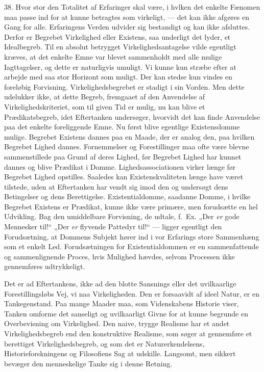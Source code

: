 \documentclass[12pt,a4paper]{book}
\newcommand{\apage}[1]{\marginnote{\footnotesize\textit{[#1]}}}
\begin{document}
38. Hvor stor den Totalitet af Erfaringer skal være, i hvlken det enkelte Fænomen maa passe ind for at kunne betragtes som virkeligt, ---
det kan ikke afgøres en Gang for alle. Erfaringens Verden udvider sig
bestandigt og kan ikke afsluttes. Derfor er Begrebet Virkelighed eller
Existens, saa underligt det lyder, et Idealbegreb. Til en absolut
betrygget Virkelighedsantagelse vilde egentligt kræves, at det enkelte
Emne var blevet sammenholdt med alle mulige Iagttagelser, og dette er
naturligvis umuligt. Vi kunne kun stræbe efter at arbejde med saa stor
Horizont som muligt. Der kan stedse kun vindes en foreløbig Forvisning.
Virkelighedsbegrebet er stadigt i sin Vorden. Men dette udelukker ikke,
at dette Begreb, fremgaaet af den Anvendelse af Virkelighedskriteriet,
som til given Tid er mulig, nu kan blive et Prædikatsbegreb, \apage{106} idet
Eftertanken undersøger, hvorvidt det kan finde Anvendelse paa det enkelte
foreliggende Emne. Nu først blive egentlige Existensdomme mulige.
Begrebet Existens dannes paa en Maade, der er analog den, paa hvilken
Begrebet Lighed dannes. Fornemmelser og Forestillinger maa ofte være
blevne sammenstillede paa Grund af deres Lighed, før Begrebet Lighed har
kunnet dannes og blive Prædikat i Domme. Lighedsassociationen virker
længe før Begrebet Lighed opstilles. Saaledes kan Existenskvaliteten
længe have været tilstede, uden at Eftertanken har vendt sig imod den og
undersøgt dens Betingelser og dens Berettigelse. Existentialdomme,
saadanne Domme, i hvilke Begrebet Existens er Prædikat, kunne ikke være
primære, men forudsætte en hel Udvikling. Bag den umiddelbare Forvisning,
de udtale, f.\ Ex. „Der \emph{er} gode Mennesker til!“ „Der \emph{er}
flyvende Pattedyr til!“ --- ligger egentligt den Forudsætning, at
Dommens Subjekt hører ind i vor Erfarings store Sammenhæng som et enkelt
Led. Forudsætningen for Existentialdommen er en sammenfattende og
sammenlignende Proces, hvis Mulighed hævdes, selvom Processen ikke
gennemføres udtrykkeligt.

Det er ad Eftertankens, ikke ad den blotte Sansnings eller det
uvilkaarlige Forestillingsløbs Vej, vi naa Virkeligheden. Den er
forsaavidt af ideel Natur, er en Tankegenstand. Paa mange Maader maa,
som Videnskabens Historie viser, Tanken omforme det sanseligt og
uvilkaarligt Givne for at kunne begrunde en Overbevisning om Virkelighed.
Den naive, trygge Realisme har et andet Virkelighedsbegreb end den
konstruktive Realisme, som søger at gennemføre et berettiget
Virkelighedsbegreb, og som det er Naturerkendelsens, Historieforskningens
og Filosofiens Sag at udskille. Langsomt, men sikkert bevæger den
menneskelige Tanke sig i denne Retning.
\end{document}
